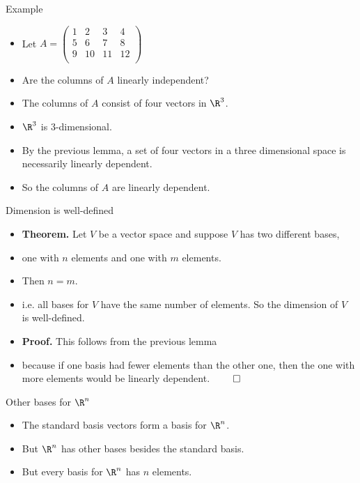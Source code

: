 \documentclass{beamer}
\begin{document}
\begin{frame}{Example}

\begin{itemize}
\item Let $A=
\begin{pmatrix}
1 & 2 & 3 & 4 \\
5 & 6 & 7 & 8 \\
9 & 10 & 11 & 12\\
\end{pmatrix}
$
\item Are the columns of $A$ linearly independent?
\item The columns of $A$ consist of four vectors in $\R^3$.
\item $\R^3$ is 3-dimensional.
\item By the previous lemma, a set of four vectors in a three dimensional space is necessarily linearly dependent.
\item So the columns of $A$ are linearly dependent.
\end{itemize}

\end{frame}

\begin{frame}{Dimension is well-defined}

\begin{itemize}
\item \textbf{Theorem.} Let $V$ be a vector space and suppose $V$ has two different bases,
\item one with $n$ elements and one with $m$ elements.
\item Then $n=m$.
\item i.e. all bases for $V$ have the same number of elements. So the dimension of $V$ is well-defined.
\item \textbf{Proof.} This follows from the previous lemma
\item because if one basis had fewer
elements than the other one, then the one with more elements would be linearly dependent. $\qed$
\end{itemize}

\end{frame}

\begin{frame}{Other bases for $\R^n$}

\begin{itemize}
\item The standard basis vectors form a basis for $\R^n$.
\item But $\R^n$ has other bases besides the standard basis.
\item But every basis for $\R^n$ has $n$ elements.
\end{itemize}

\end{frame}
\end{document}
